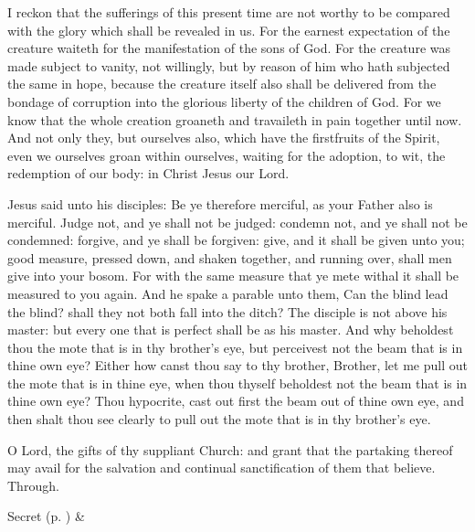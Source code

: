  I reckon that the sufferings of this present time are not worthy to be compared with the glory which shall be revealed in us. For the earnest expectation of the creature waiteth for the manifestation of the sons of God. For the creature was made subject to vanity, not willingly, but by reason of him who hath subjected the same in hope, because the creature itself also shall be delivered from the bondage of corruption into the glorious liberty of the children of God. For we know that the whole creation groaneth and travaileth in pain together until now. And not only they, but ourselves also, which have the firstfruits of the Spirit, even we ourselves groan within ourselves, waiting for the adoption, to wit, the redemption of our body: in Christ Jesus our Lord.


 Jesus said unto his disciples: Be ye therefore merciful, as your Father also is merciful. Judge not, and ye shall not be judged: condemn not, and ye shall not be condemned: forgive, and ye shall be forgiven: give, and it shall be given unto you; good measure, pressed down, and shaken together, and running over, shall men give into your bosom. For with the same measure that ye mete withal it shall be measured to you again. And he spake a parable unto them, Can the blind lead the blind? shall they not both fall into the ditch? The disciple is not above his master: but every one that is perfect shall be as his master. And why beholdest thou the mote that is in thy brother's eye, but perceivest not the beam that is in thine own eye? Either how canst thou say to thy brother, Brother, let me pull out the mote that is in thine eye, when thou thyself beholdest not the beam that is in thine own eye? Thou hypocrite, cast out first the beam out of thine own eye, and then shalt thou see clearly to pull out the mote that is in thy brother's eye.


\secret
{} O Lord, the gifts of thy suppliant Church: and grant that the partaking thereof may avail for the salvation and continual sanctification of them that believe. Through.
\begin{rubric}
     Secret  (p. \pageref{SPSaints}) \&  
\end{rubric}


